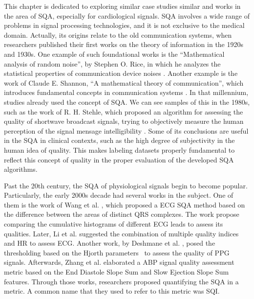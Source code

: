 

This chapter is dedicated to exploring similar case studies similar and works in the area of \gls{SQA}, especially for cardiological signals. \gls{SQA} involves a wide range of problems in signal processing technologies, and it is not exclusive to the medical domain. Actually, its origins relate to the old communication systems, when researchers published their first works on the theory of information in the 1920s and 1930s. One example of such foundational works is the ``Mathematical analysis of random noise'', by Stephen O. Rice, in which he analyzes the statistical properties of communication device noises \cite{origins-1}. Another example is the work of Claude E. Shannon, ``A mathematical theory of communication'', which introduces fundamental concepts in communication systems \cite{origins-2}. In that millennium, studies already used the concept of \gls{SQA}. We can see samples of this in the 1980s, such as the work of R. H. Stehle, which proposed an algorithm for assessing the quality of shortwave broadcast signals, trying to objectively measure the human perception of the signal mensage intelligibility \cite{origins-3}. Some of its conclusions are useful in the \gls{SQA} in clinical contexts, such as the high degree of subjectivity in the human idea of quality. This makes labeling datasets properly fundamental to reflect this concept of quality in the proper evaluation of the developed \gls{SQA} algorithms.
	
Past the 20th century, the \gls{SQA} of physiological signals begin to become popular. Particularly, the early 2000s decade had several works in the subject. One of them is the work of Wang et al. \cite{2000s-1}, which proposed a \gls{ECG} \gls{SQA} method based on the difference between the areas of distinct QRS complexes. The work propose comparing the cumulative histograms of different \gls{ECG} leads to assess its qualities. Later,  Li et al. \cite{2000s-2} suggested the combination of multiple quality indices and \gls{HR} to assess \gls{ECG}. Another work, by Deshmane et al. \cite{2000s-3}, posed the thresholding based on the Hjorth parameters~\cite{hjorth-parameters} to assess the quality of \gls{PPG} signals. Afterwards, Zhang et al. \cite{2000s-4} elaborated a \gls{ABP} signal quality assessment metric based on the End Diastole Slope Sum and Slow Ejection Slope Sum features. Through those works, researchers proposed quantifying the \gls{SQA} in a metric. A common name that they used to refer to this metric was \gls{SQI}.


